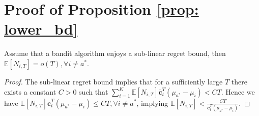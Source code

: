 \section{Proof of Proposition \ref{prop: lower_bd}}
\label{sce: app_pf_lower_bd}

\begin{lemma}
\label{lemma: R_N_relation}
Assume that a bandit algorithm enjoys a sub-linear regret bound, then 
$\mathbb{E}[ N_{i,T} ] = o(T), \forall i \neq a^*$.
\end{lemma}

\begin{proof}
The sub-linear regret bound implies that for a sufficiently large $T$ there exists a constant $C > 0$ such that 
$\sum_{i=1}^{K} \mathbb{E}[ N_{i,T} ] \boldsymbol{\overline{c}}_t^T (\mu_{a^*} - \mu_{i}) < CT $. 
Hence we have 
$\mathbb{E}[ N_{i,T} ] \boldsymbol{\overline{c}}_t^T (\mu_{a^*} - \mu_{i}) \leq CT, \forall i \neq a^*$, implying 
$\mathbb{E}[ N_{i,T} ] < \frac{CT}{\boldsymbol{\overline{c}}_t^T (\mu_{a^*} - \mu_{i})}$.
\end{proof}


